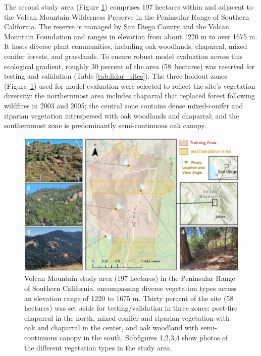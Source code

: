 \documentclass[remotesensing,article,accept,pdftex,moreauthors]{Definitions/mdpi}
\renewcommand{\hl}[1]{#1}
\begin{document}
The second study area (Figure \ref{fig:volcan_mtn_study_area}) comprises 197 hectares within and adjacent to the Volcan Mountain Wilderness Preserve in the Peninsular Range of Southern California. The reserve is managed by San Diego County and the Volcan Mountain Foundation and ranges in elevation from about 1220 m to over 1675 m.
 It hosts diverse plant communities, including oak woodlands, chaparral, mixed conifer forests, and grasslands. To ensure robust model evaluation across this ecological gradient, roughly 30 percent of the area \mbox{(58 hectares)} was reserved for testing and validation (Table \ref{tab:lidar_sites}). The three holdout zones \mbox{(Figure \ref{fig:volcan_mtn_study_area})} used for model evaluation were selected to reflect the site’s vegetation diversity: the northernmost area includes chaparral that replaced forest following wildfires in 2003 and 2005; the central zone contains dense mixed-conifer and riparian vegetation interspersed with oak woodlands and chaparral; and the southernmost zone is predominantly semi-continuous oak canopy.


\begin{figure}[H]

    \includegraphics[width=0.98\linewidth]{figures/Volcan_Mtn_Study_Area.png}
    \caption{\hl{Volcan} %
 Mountain study area (197 hectares) in the Peninsular Range of Southern California, encompassing diverse vegetation types across an elevation range of 1220 to 1675 m. Thirty percent of the site (58 hectares) was set aside for testing/validation in three zones: post-fire chaparral in the north, mixed conifer and riparian vegetation with oak and chaparral in the center, and oak woodland with semi-continuous canopy in the south. Subfigures 1,2,3,4 show photos of the different vegetation types in the study area.}
    \label{fig:volcan_mtn_study_area}
\end{figure}
\end{document}

